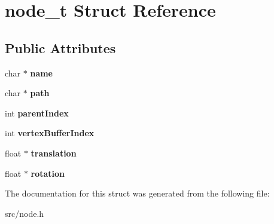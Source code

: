 \hypertarget{structnode__t}{}\section{node\+\_\+t Struct Reference}
\label{structnode__t}
\subsection*{Public Attributes}
\begin{DoxyCompactItemize}
\item 
\hypertarget{structnode__t_a84f8212d7d9b2f1e6aa5b44889685fdf}{}char $\ast$ {\bfseries name}\label{structnode__t_a84f8212d7d9b2f1e6aa5b44889685fdf}

\item 
\hypertarget{structnode__t_a00f91d5b050d6c3f3d6768e05306fcea}{}char $\ast$ {\bfseries path}\label{structnode__t_a00f91d5b050d6c3f3d6768e05306fcea}

\item 
\hypertarget{structnode__t_a764aaf231ec56c8cf02219d3d6f2c6e4}{}int {\bfseries parent\+Index}\label{structnode__t_a764aaf231ec56c8cf02219d3d6f2c6e4}

\item 
\hypertarget{structnode__t_a809adc6240edf57f335173670ad21d7f}{}int {\bfseries vertex\+Buffer\+Index}\label{structnode__t_a809adc6240edf57f335173670ad21d7f}

\item 
\hypertarget{structnode__t_a54768e498132b124f58f12c58b880216}{}float $\ast$ {\bfseries translation}\label{structnode__t_a54768e498132b124f58f12c58b880216}

\item 
\hypertarget{structnode__t_ae9823b400f5f60f0e6152055eca68703}{}float $\ast$ {\bfseries rotation}\label{structnode__t_ae9823b400f5f60f0e6152055eca68703}

\end{DoxyCompactItemize}


The documentation for this struct was generated from the following file\+:\begin{DoxyCompactItemize}
\item 
src/node.\+h\end{DoxyCompactItemize}
